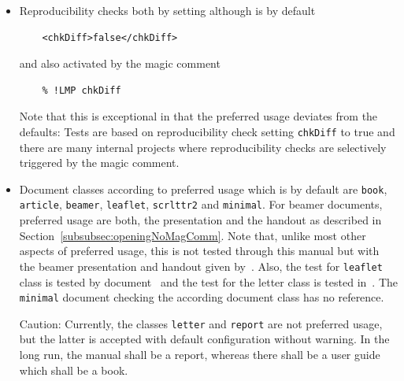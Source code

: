 \begin{itemize}
  but activated by the magic comment 
  \begin{verbatim}
    % !LMP latexmk
  \end{verbatim}
  \item Reproducibility checks both by setting although is by default 
  \begin{verbatim}
    <chkDiff>false</chkDiff>
  \end{verbatim}
  and also activated by the magic comment 
  \begin{verbatim}
    % !LMP chkDiff
  \end{verbatim}
  Note that this is exceptional in that the preferred usage deviates from the defaults: 
  Tests are based on reproducibility check setting \texttt{chkDiff} to true 
  and there are many internal projects where reproducibility checks are selectively triggered 
  by the magic comment. 
  \item Document classes according to preferred usage which is by default 
  are \texttt{book}, \texttt{article}, 
  \texttt{beamer}, \texttt{leaflet}, \texttt{scrlttr2} and \texttt{minimal}. 
  For beamer documents, preferred usage are both, the presentation and the handout 
  as described in Section~\ref{subsubsec:openingNoMagComm}. 
  Note that, unlike most other aspects of preferred usage, 
  this is not tested through this manual 
  but with the beamer presentation and handout given by~\cite{PresBeamer}. 
  Also, the test for \texttt{leaflet} class is tested by document~\cite{LeafLeaf} 
  and the test for the letter class is tested in~\cite{LetScrlttr2}. 
  The \texttt{minimal} document checking the according document class has no reference. 

  Caution: Currently, the classes \texttt{letter} and \texttt{report} 
  are not preferred usage, 
  but the latter is accepted with default configuration without warning. 
  In the long run, the manual shall be a report, whereas there shall be a user guide 
  which shall be a book. 
  

\end{itemize}
